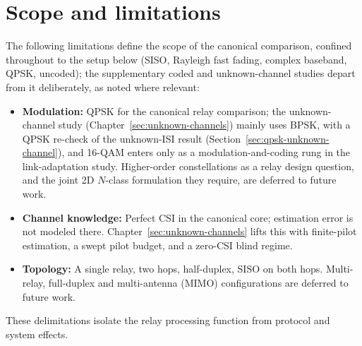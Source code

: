 \section{Scope and limitations}\label{sec:scope-and-delimitations}

The following limitations define the scope of the canonical comparison, confined throughout to the setup below (SISO, Rayleigh fast fading, complex baseband, QPSK, uncoded); the supplementary coded and unknown-channel studies depart from it deliberately, as noted where relevant:

\begin{itemize}
\tightlist
\item
  \textbf{Modulation:} QPSK for the canonical relay comparison; the unknown-channel study (Chapter~\ref{sec:unknown-channels}) mainly uses BPSK, with a QPSK re-check of the unknown-ISI result (Section~\ref{sec:qpsk-unknown-channel}), and 16-QAM enters only as a modulation-and-coding rung in the link-adaptation study. Higher-order constellations as a relay design question, and the joint 2D $N$-class formulation they require, are deferred to future work.
\item
  \textbf{Channel knowledge:} Perfect CSI in the canonical core; estimation error is not modeled there. Chapter~\ref{sec:unknown-channels} lifts this with finite-pilot estimation, a swept pilot budget, and a zero-CSI blind regime.
    \item
  \textbf{Topology:} A single relay, two hops, half-duplex, SISO on both hops. Multi-relay, full-duplex and multi-antenna (MIMO) configurations are deferred to future work.
\end{itemize}

These delimitations isolate the relay processing function from protocol and system effects.
